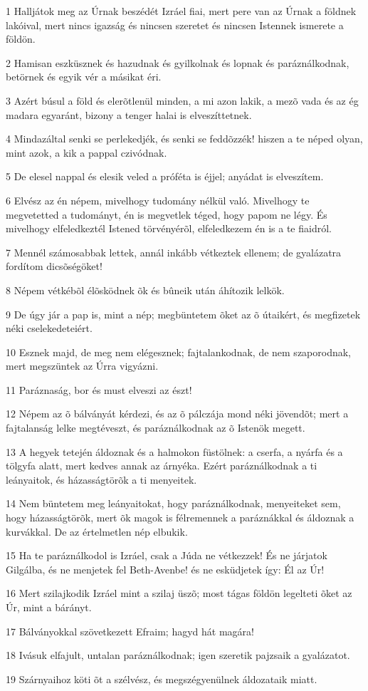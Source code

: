 \par 1 Halljátok meg az Úrnak beszédét Izráel fiai, mert pere van az Úrnak a földnek lakóival, mert nincs igazság és nincsen szeretet és nincsen Istennek ismerete a földön.
\par 2 Hamisan eszküsznek és hazudnak és gyilkolnak és lopnak és paráználkodnak, betörnek és egyik vér a másikat éri.
\par 3 Azért búsul a föld és elerõtlenül minden, a mi azon lakik, a mezõ vada és az ég madara egyaránt, bizony a tenger halai is elveszíttetnek.
\par 4 Mindazáltal senki se perlekedjék, és senki se feddõzzék! hiszen a te néped olyan, mint azok, a kik a pappal czivódnak.
\par 5 De elesel nappal és elesik veled a próféta is éjjel; anyádat is elveszítem.
\par 6 Elvész az én népem, mivelhogy tudomány nélkül való. Mivelhogy te megvetetted a tudományt, én is megvetlek téged, hogy papom ne légy. És mivelhogy elfeledkeztél Istened törvényérõl, elfeledkezem én is a te fiaidról.
\par 7 Mennél számosabbak lettek, annál inkább vétkeztek ellenem; de gyalázatra fordítom dicsõségöket!
\par 8 Népem vétkébõl élõsködnek õk és bûneik után áhítozik lelkök.
\par 9 De úgy jár a pap is, mint a nép; megbüntetem õket az õ útaikért, és megfizetek néki cselekedeteiért.
\par 10 Esznek majd, de meg nem elégesznek; fajtalankodnak, de nem szaporodnak,  mert megszüntek az Úrra vigyázni.
\par 11 Paráznaság, bor és must elveszi az észt!
\par 12 Népem az õ bálványát kérdezi, és az õ pálczája mond néki jövendõt; mert a fajtalanság  lelke megtéveszt, és paráználkodnak az õ Istenök megett.
\par 13 A hegyek tetején áldoznak és a halmokon füstölnek: a cserfa, a nyárfa és a tölgyfa alatt, mert kedves annak az árnyéka. Ezért paráználkodnak a ti leányaitok, és házasságtörõk a ti menyeitek.
\par 14 Nem büntetem meg leányaitokat, hogy paráználkodnak, menyeiteket sem, hogy házasságtörõk, mert õk magok is félremennek a paráznákkal és áldoznak a kurvákkal. De az értelmetlen nép elbukik.
\par 15 Ha te paráználkodol is Izráel, csak a Júda ne vétkezzek! És ne járjatok Gilgálba, és ne menjetek fel Beth-Avenbe! és ne esküdjetek így: Él az Úr!
\par 16 Mert szilajkodik Izráel mint a szilaj üszõ; most tágas földön legelteti õket az Úr, mint a bárányt.
\par 17 Bálványokkal szövetkezett Efraim; hagyd hát magára!
\par 18 Ivásuk elfajult, untalan paráználkodnak; igen szeretik pajzsaik a gyalázatot.
\par 19 Szárnyaihoz köti õt a szélvész, és megszégyenülnek áldozataik miatt.

